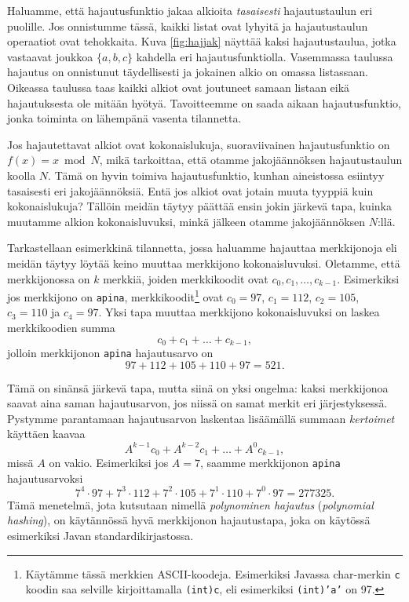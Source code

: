 Haluamme, että hajautusfunktio jakaa alkioita \emph{tasaisesti}
hajautustaulun eri puolille.
Jos onnistumme tässä, kaikki listat ovat lyhyitä ja
hajautustaulun operaatiot ovat tehokkaita.
Kuva \ref{fig:hajjak} näyttää kaksi hajautustaulua, jotka vastaavat
joukkoa $\{a,b,c\}$ kahdella eri hajautusfunktiolla.
Vasemmassa taulussa hajautus on onnistunut täydellisesti
ja jokainen alkio on omassa listassaan.
Oikeassa taulussa taas kaikki alkiot ovat joutuneet samaan
listaan eikä hajautuksesta ole mitään hyötyä.
Tavoitteemme on saada aikaan hajautusfunktio,
jonka toiminta on lähempänä vasenta tilannetta.

Jos hajautettavat alkiot ovat kokonaislukuja,
suoraviivainen hajautusfunktio on $f(x)=x \bmod N$,
mikä tarkoittaa, että otamme jakojäännöksen hajautustaulun koolla $N$.
Tämä on hyvin toimiva hajautusfunktio,
kunhan aineistossa esiintyy tasaisesti eri jakojäännöksiä.
Entä jos alkiot ovat jotain muuta tyyppiä kuin kokonaislukuja?
Tällöin meidän täytyy päättää ensin jokin järkevä tapa,
kuinka muutamme alkion kokonaisluvuksi,
minkä jälkeen otamme jakojäännöksen $N$:llä.

Tarkastellaan esimerkkinä tilannetta, jossa haluamme hajauttaa merkkijonoja
eli mei\-dän täytyy löytää keino muuttaa merkkijono kokonaisluvuksi.
Oletamme, että merkkijonossa on $k$ merkkiä,
joiden merkkikoodit ovat $c_0,c_1,\dots,c_{k-1}$.
Esimerkiksi jos merkkijono on \texttt{apina},
merkkikoodit\footnote{Käytämme tässä merkkien ASCII-koodeja.
Esimerkiksi Javassa char-merkin \texttt{c} koodin saa
selville kirjoittamalla \texttt{(int)c}, eli esimerkiksi
\texttt{(int)'a'} on 97.} ovat $c_0=97$, $c_1=112$, $c_2=105$,
$c_3=110$ ja $c_4=97$.
Yksi tapa muuttaa merkkijono kokonaisluvuksi
on laskea merkkikoodien summa
\[ c_0 + c_1 + \dots + c_{k-1},\]
jolloin merkkijonon \texttt{apina} hajautusarvo on
\[97+112+105+110+97=521.\]


Tämä on sinänsä järkevä tapa, mutta siinä on yksi ongelma:
kaksi merkkijonoa saavat aina saman hajautusarvon,
jos niissä on samat merkit eri järjestyksessä.
Pystymme parantamaan hajautusarvon laskentaa lisäämällä
summaan \emph{kertoimet} käyttäen kaavaa
\[ A^{k-1} c_0 + A^{k-2} c_1 + \dots + A^0 c_{k-1},\]
missä $A$ on vakio.
Esimerkiksi jos $A=7$, saamme merkkijonon \texttt{apina} hajautusarvoksi
\[7^4 \cdot 97+7^3 \cdot 112+7^2 \cdot 105+7^1 \cdot 110+7^0 \cdot 97=277325.\]
Tämä menetelmä, jota kutsutaan nimellä \emph{polynominen hajautus}
(\emph{polynomial hashing}),
on käytän\-nössä hyvä merkkijonon hajautustapa,
joka on käytössä esimerkiksi Javan standardikirjastossa.

